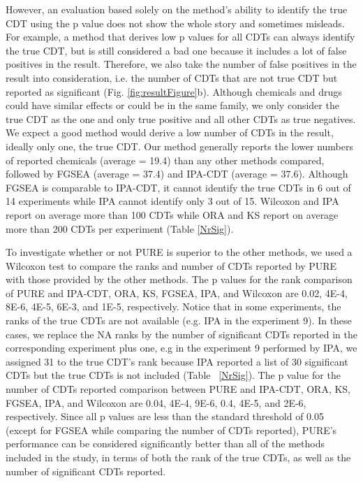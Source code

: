 However, an evaluation based solely on the method's ability to identify the true CDT using the p value does not show the whole story and sometimes misleads.
For example, a method that derives low p values for all CDTs can always identify the true CDT, but is still considered a bad one because it includes a lot of false positives in the result.
Therefore, we also take the number of false positives in the result into consideration, i.e. the number of CDTs that are not true CDT but reported as significant (Fig. \ref{fig:resultFigure}b).
Although chemicals and drugs could have similar effects or could be in the same family, we only consider the true CDT as the one and only true positive and all other CDTs as true negatives.
We expect a good method would derive a low number of CDTs in the result, ideally only one, the true CDT.
Our method generally reports the lower numbers of reported chemicals (average = 19.4) than any other methods compared, followed by FGSEA (average = 37.4) and IPA-CDT (average = 37.6).
Although FGSEA is comparable to IPA-CDT, it cannot identify the true CDTs in 6 out of 14 experiments while IPA  cannot identify only 3 out of 15.
Wilcoxon and IPA report on average more than 100 CDTs while ORA and KS report on average more than 200 CDTs per experiment (Table \ref{NrSig}).

To investigate whether or not  PURE is superior to the other methods, we used a Wilcoxon test to compare the ranks and number of CDTs reported by PURE with those provided by the  other methods. The p values for the rank comparison of PURE and IPA-CDT, ORA, KS, FGSEA, IPA, and Wilcoxon are 0.02, 4E-4, 8E-6, 4E-5, 6E-3, and 1E-5, respectively. Notice that in some experiments, the ranks of the true CDTs are not available (e.g. IPA in the experiment 9). In these cases, we replace the NA ranks by the number of significant CDTs reported in the corresponding experiment plus one, e.g in the experiment 9 performed by IPA, we assigned 31 to the true CDT's rank because IPA reported a list of 30 significant CDTs but the true CDTs is not included (Table ~\ref{NrSig}). The p value for the number of CDTs reported comparison between PURE and IPA-CDT, ORA, KS,  FGSEA, IPA, and Wilcoxon are 0.04, 4E-4, 9E-6, 0.4, 4E-5, and 2E-6, respectively. Since all  p values are less than the standard threshold of 0.05 (except for FGSEA while comparing the number of CDTs reported), PURE's performance can be considered significantly better than all of the methods included in the study, in terms of both the rank of the true CDTs, as well as the number of significant CDTs reported.

